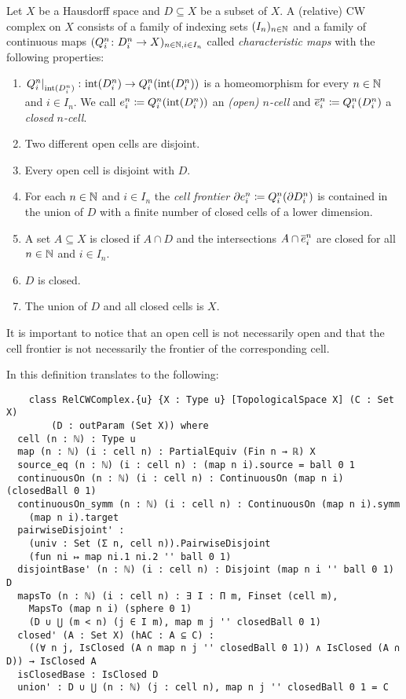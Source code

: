 \begin{defi}
    Let $X$ be a Hausdorff space and $D \subseteq X$ be a subset of $X$. 
    A (relative) CW complex on $X$ consists of a family of indexing sets $(I_n)_{n \in \bN}$ and a family of continuous maps $(Q_i^n \colon D_i^n \to X)_{n \in \bN, i \in I_n}$ called \emph{characteristic maps} with the following properties: 
    \begin{enumerate}
        \item $\restrict{Q_i^n}{\interior{D_i^n}} \colon \interior{D_i^n} \to Q_i^n(\interior{D_i^n})$ is a homeomorphism for every $n \in \bN$ and $i \in I_n$. We call $\openCell{n}{i} \coloneq Q_i^n(\interior{D_i^n})$ an \emph{(open) $n$-cell} and $\closedCell{n}{i} \coloneq Q_i^n(D_i^n)$ a \emph{closed $n$-cell}.
        \item Two different open cells are disjoint.
        \item Every open cell is disjoint with $D$.
        \item For each $n \in \bN$ and $i \in I_n$ the \emph{cell frontier} $\cellFrontier{n}{i} \coloneq Q_i^n(\boundary D_i^n)$ is contained in the union of $D$ with a finite number of closed cells of a lower dimension.
        \item A set $A \subseteq X$ is closed if $A \cap D$ and the intersections $A \cap \closedCell{n}{i}$ are closed for all $n \in \bN$ and $i \in I_n$.
        \item $D$ is closed. 
        \item The union of $D$ and all closed cells is $X$.
    \end{enumerate}
\end{defi}

It is important to notice that an open cell is not necessarily open and that the cell frontier is not necessarily the frontier of the corresponding cell.

In \mathlib this definition translates to the following:
 
\begin{lstlisting}
    class RelCWComplex.{u} {X : Type u} [TopologicalSpace X] (C : Set X) 
        (D : outParam (Set X)) where
  cell (n : ℕ) : Type u
  map (n : ℕ) (i : cell n) : PartialEquiv (Fin n → ℝ) X
  source_eq (n : ℕ) (i : cell n) : (map n i).source = ball 0 1
  continuousOn (n : ℕ) (i : cell n) : ContinuousOn (map n i) (closedBall 0 1)
  continuousOn_symm (n : ℕ) (i : cell n) : ContinuousOn (map n i).symm 
    (map n i).target
  pairwiseDisjoint' :
    (univ : Set (Σ n, cell n)).PairwiseDisjoint 
    (fun ni ↦ map ni.1 ni.2 '' ball 0 1)
  disjointBase' (n : ℕ) (i : cell n) : Disjoint (map n i '' ball 0 1) D
  mapsTo (n : ℕ) (i : cell n) : ∃ I : Π m, Finset (cell m),
    MapsTo (map n i) (sphere 0 1) 
    (D ∪ ⋃ (m < n) (j ∈ I m), map m j '' closedBall 0 1)
  closed' (A : Set X) (hAC : A ⊆ C) :
    ((∀ n j, IsClosed (A ∩ map n j '' closedBall 0 1)) ∧ IsClosed (A ∩ D)) → IsClosed A
  isClosedBase : IsClosed D
  union' : D ∪ ⋃ (n : ℕ) (j : cell n), map n j '' closedBall 0 1 = C
\end{lstlisting}

